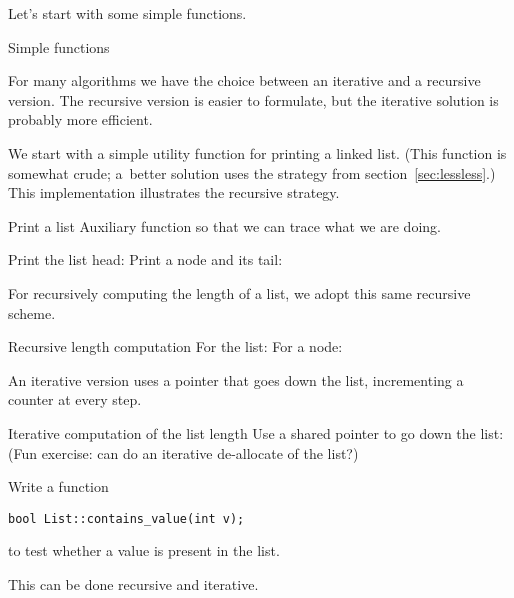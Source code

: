 Let's start with some simple functions.

 {Simple functions}

For many algorithms we have the choice between an iterative and a
recursive version. The recursive version is easier to formulate, but
the iterative solution is probably more efficient.

We start with a simple utility function for printing a linked list.
(This function is somewhat crude; a~better solution uses
the strategy from section~\ref{sec:lessless}.)
This implementation illustrates the recursive strategy.

\begin{block}{Print a list}
  \label{sl:linkedlist-print}
  Auxiliary function so that we can trace what we are doing.
  \begin{multicols}{2}
    Print the list head:
    \columnbreak
    Print a node and its tail:
  \end{multicols}
\end{block}

For recursively computing the length of a list,
we adopt this same recursive scheme.

\begin{block}{Recursive length computation}
  \label{sl:linkedlist-length-recur}
  For the list:
  For a node:
\end{block}

An iterative version uses a pointer that goes down the list,
incrementing a counter at every step. 

\begin{block}{Iterative computation of the list length}
  \label{sl:linkedlist-length-iter}
  Use a shared pointer to go down the list:
  (Fun exercise: can do an iterative de-allocate of the list?)
\end{block}

\begin{exercise}
  \label{ex:list-contains}
  Write a function
\begin{lstlisting}
bool List::contains_value(int v);
\end{lstlisting}
to test whether a value is present in the list.

This can be done recursive and iterative.
\end{exercise}

